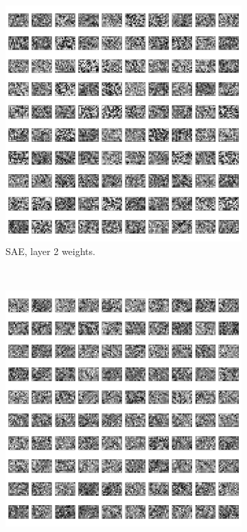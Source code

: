 \documentclass{article}
\begin{document}
\begin{figure}[!ht]
  \centering
  \begin{subfigure}[t]{0.47\textwidth}
    \centering
    \includegraphics[width=\textwidth]{../plots/3_2_1/sae_2l.png}
    \caption{SAE, layer 2 weights.}
    \label{fig:sael2}
  \end{subfigure}
  ~
  \addtocounter{subfigure}{1}
  \begin{subfigure}[t]{0.47\textwidth}
    \centering
    \includegraphics[width=\textwidth]{../plots/3_2_1/dbn_2l.png}

\end{subfigure}
\end{figure}
\end{document}
